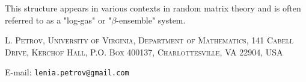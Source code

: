 \documentclass[letterpaper,11pt,oneside,reqno]{article}
\numberwithin{equation}{section}
\theoremstyle{definition}
\begin{document}
This structure appears in various contexts in random matrix theory and is often referred to as a "log-gas" or "$\beta$-ensemble" system.































\medskip

\textsc{L. Petrov, University of Virginia, Department of Mathematics, 141 Cabell Drive, Kerchof Hall, P.O. Box 400137, Charlottesville, VA 22904, USA}

E-mail: \texttt{lenia.petrov@gmail.com}
\end{document}
